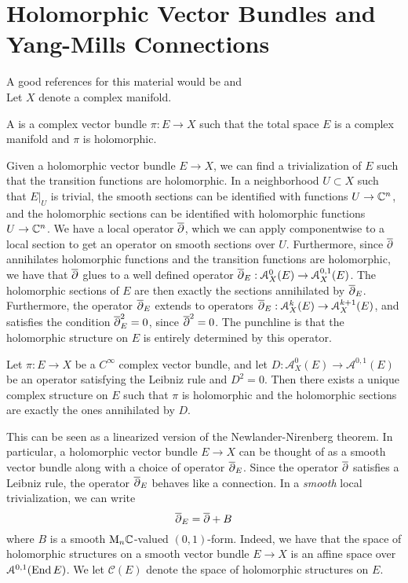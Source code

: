 %
\section{Holomorphic Vector Bundles and Yang-Mills Connections}
%
A good references for this material would be \cite{Kob} and \cite{McDuff}\\

Let $X$ denote a complex manifold.
%
\begin{defn}
A  is a complex vector bundle $\pi : E \to X$
such that the total space $E$ is a complex manifold and $\pi$ is holomorphic.
\end{defn}
%
Given a holomorphic vector bundle $E \to X$, we can find a trivialization
of $E$ such that the transition functions are holomorphic. In a neighborhood
$U \subset X$ such that $E\vert_U$ is trivial, the smooth sections can
be identified with functions $U \to \mathbb{C}^n$, and the holomorphic sections
can be identified with holomorphic functions $U \to \mathbb{C}^n$. We
have a local operator $\overline{\partial}$, which we can apply componentwise to a local
section to get an operator on smooth sections over $U$. Furthermore, since
$\overline{\partial}$ annihilates holomorphic functions and the transition functions
are holomorphic, we have that $\overline{\partial}$ glues to a well defined operator
$\overline{\partial}_E : \mathcal{A}^0_X(E) \to \mathcal{A}^{0,1}_X(E)$. The holomorphic
sections of $E$ are then exactly the sections annihilated by $\overline{\partial}_E$. Furthermore,
the operator $\overline{\partial}_E$ extends to operators
$\overline{\partial}_E : \mathcal{A}^k_X(E) \to \mathcal{A}^{k+1}_X(E)$,
and satisfies the condition $\overline{\partial}_E^2 = 0$, since $\overline{\partial}^2 = 0$. The punchline
is that the holomorphic structure on $E$ is entirely determined by this operator.
%
\begin{thm}
Let $\pi : E \to X$ be a $C^\infty$ complex vector bundle, and let
$D : \mathcal{A}^0_X(E) \to \mathcal{A}^{0,1}(E)$ be an operator satisfying the
Leibniz rule and $D^2 = 0$. Then there exists a unique complex structure on $E$
such that $\pi$ is holomorphic and the holomorphic sections are exactly the ones
annihilated by $D$.
\end{thm}
%
This can be seen as a linearized version of the Newlander-Nirenberg theorem.
In particular, a holomorphic vector bundle $E \to X$ can be thought
of as a smooth vector bundle along with a choice of operator $\overline{\partial}_E$.
Since the operator $\overline{\partial}$ satisfies a Leibniz rule, the operator $\overline{\partial}_E$
behaves like a connection. In a \emph{smooth} local trivialization,
we can write
\[
\overline{\partial}_E = \overline{\partial} + B
\]
where $B$ is a smooth $\mathrm{M}_n\mathbb{C}$-valued $(0,1)$-form. Indeed,
we have that the space of holomorphic structures on a smooth vector bundle
$E \to X$ is an affine space over $\mathcal{A}^{0,1}(\operatorname{End} E)$. We
let $\mathscr{C}(E)$ denote the space of holomorphic structures on $E$.\\

